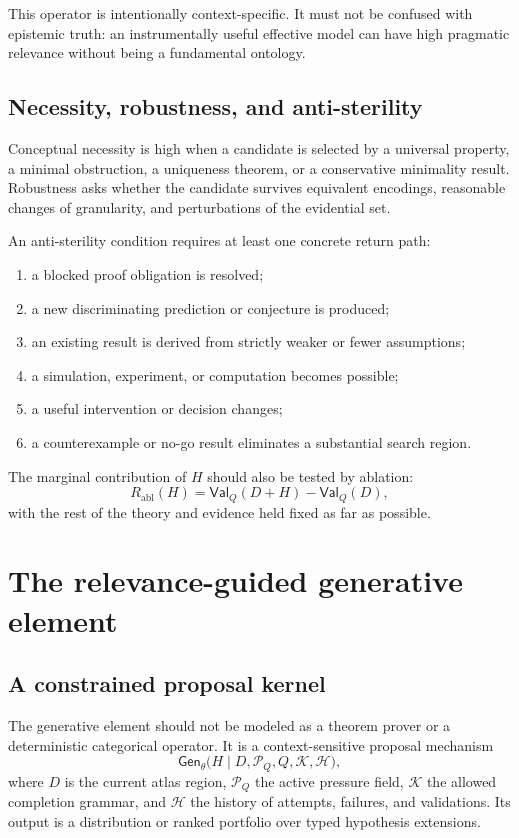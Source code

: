 \documentclass[11pt]{article}
\newcommand{\Gen}{\mathsf{Gen}}
\newcommand{\Val}{\mathsf{Val}}
\begin{document}
This operator is intentionally context-specific. It must not be confused with epistemic truth: an
instrumentally useful effective model can have high pragmatic relevance without being a fundamental
ontology.

\subsection{Necessity, robustness, and anti-sterility}

Conceptual necessity is high when a candidate is selected by a universal property, a minimal
obstruction, a uniqueness theorem, or a conservative minimality result. Robustness asks whether the
candidate survives equivalent encodings, reasonable changes of granularity, and perturbations of the
evidential set.

An anti-sterility condition requires at least one concrete return path:
\begin{enumerate}
  \item a blocked proof obligation is resolved;
  \item a new discriminating prediction or conjecture is produced;
  \item an existing result is derived from strictly weaker or fewer assumptions;
  \item a simulation, experiment, or computation becomes possible;
  \item a useful intervention or decision changes;
  \item a counterexample or no-go result eliminates a substantial search region.
\end{enumerate}

The marginal contribution of $H$ should also be tested by ablation:
\begin{equation}
R_{\mathrm{abl}}(H)
=\Val_Q(D+H)-\Val_Q(D),
\end{equation}
with the rest of the theory and evidence held fixed as far as possible.

\section{The relevance-guided generative element}

\subsection{A constrained proposal kernel}

The generative element should not be modeled as a theorem prover or a deterministic categorical
operator. It is a context-sensitive proposal mechanism
\begin{equation}
\Gen_\theta
\bigl(H\mid D,\mathcal{P}_Q,Q,\mathcal{K},\mathcal{H}\bigr),
\end{equation}
where $D$ is the current atlas region, $\mathcal{P}_Q$ the active pressure field, $\mathcal{K}$ the
allowed completion grammar, and $\mathcal{H}$ the history of attempts, failures, and validations.
Its output is a distribution or ranked portfolio over typed hypothesis extensions.
\end{document}
